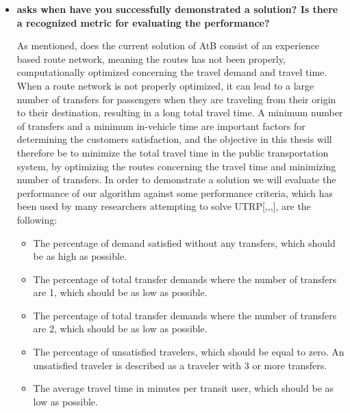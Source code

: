 \begin{itemize}

\item \citet{cohen88} \textbf{asks when have you successfully demonstrated a solution? Is there a recognized metric for evaluating the performance?}

As mentioned, does the current solution of AtB consist of an experience based route network, meaning the routes has not been properly, computationally optimized concerning the travel demand and travel time. When a route network is not properly optimized, it can lead to a large number of transfers for passengers when they are traveling from their origin to their destination, resulting in a long total travel time. A minimum number of transfers and a minimum in-vehicle time are important factors for determining the customers satisfaction, and the objective in this thesis will therefore be to minimize the total travel time in the public transportation system, by optimizing the routes concerning the travel time and minimizing number of transfers. In order to demonstrate a solution\citep{cohen88} we will evaluate the performance of our algorithm against some performance criteria, which has been used by many researchers attempting to solve UTRP[\citep{kechagiopoulos14},\citep{mandl80},\citep{nikolic14},\citep{fan09}], are the following:
\begin{itemize}
\item The percentage of demand satisfied without any transfers, which should be as high as possible.
\item The percentage of total transfer demands where the number of transfers are 1, which should be as low as possible.
\item The percentage of total transfer demands where the number of transfers are 2, which should be as low as possible.
\item The percentage of unsatisfied travelers, which should be equal to zero. An unsatisfied traveler is described as a traveler with 3 or more transfers.
\item The average travel time in minutes per transit user, which should be as low as possible. %
\end{itemize}


\end{itemize}
